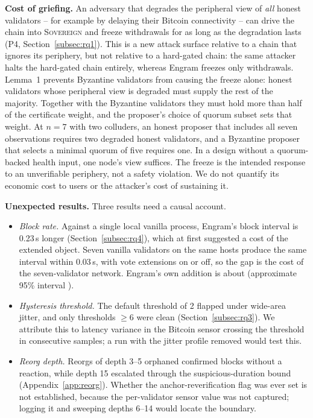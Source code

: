 \textbf{Cost of griefing.} An adversary that degrades the peripheral view of
\emph{all} honest validators -- for example by delaying their Bitcoin
connectivity -- can drive the chain into \textsc{Sovereign} and freeze
withdrawals for as long as the degradation lasts (P4,
Section~\ref{subsec:rq1}). This is a new attack surface relative to a chain
that ignores its periphery, but not relative to a hard-gated chain: the same
attacker halts the hard-gated chain entirely, whereas Engram freezes only
withdrawals. Lemma~1 prevents Byzantine validators from causing the freeze
alone: honest validators whose peripheral view is degraded must supply the
rest of the majority. Together with the Byzantine validators they must hold
more than half of the certificate weight, and the proposer's choice of quorum
subset sets that weight. At $n{=}7$ with two colluders, an honest proposer that
includes all seven observations requires two degraded honest validators, and a
Byzantine proposer that selects a minimal quorum of five requires one.
In a design without a quorum-backed health input, one node's view
suffices. The freeze is the intended response to an
unverifiable periphery, not a safety violation. We do not quantify its
economic cost to users or the attacker's cost of sustaining it.

\textbf{Unexpected results.} Three results need a causal account.
\begin{itemize}
  \item \emph{Block rate.} Against a single local vanilla process,
  Engram's block interval is 0.23\,s longer (Section~\ref{subsec:rq4}), which
  at first suggested a cost of the extended object. Seven vanilla validators
  on the same hosts produce the same interval within 0.03\,s, with vote
  extensions on or off, so the gap is the cost of the seven-validator network.
  Engram's own addition is about \resOverheadPct{} (approximate 95\% interval \resOverheadCI{}).
  \item \emph{Hysteresis threshold.} The default threshold of 2 flapped under
  wide-area jitter, and only thresholds $\geq 6$ were clean
  (Section~\ref{subsec:rq3}). We attribute this to latency variance in the
  Bitcoin sensor crossing the threshold in consecutive samples; a run with
  the jitter profile removed would test this.
  \item \emph{Reorg depth.} Reorgs of depth 3--5 orphaned confirmed blocks
  without a reaction, while depth 15 escalated through the
  suspicious-duration bound (Appendix~\ref{app:reorg}). Whether the
  anchor-reverification flag was ever set is not established, because the
  per-validator sensor value was not captured; logging it and sweeping depths
  6--14 would locate the boundary.
\end{itemize}

